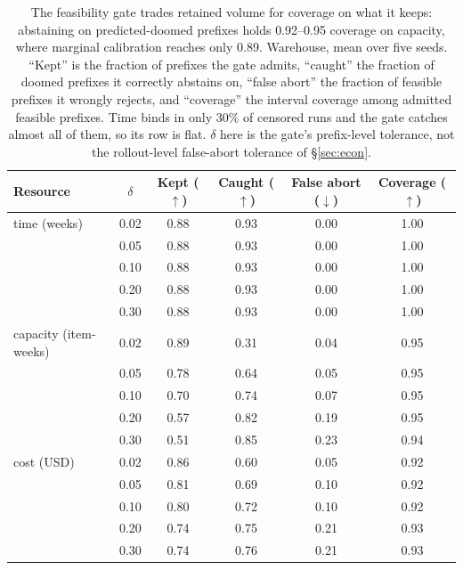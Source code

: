 \documentclass{article}
\begin{document}
\begin{table}[t]
  \caption{The feasibility gate trades retained volume for coverage on what it keeps:
  abstaining on predicted-doomed prefixes holds 0.92--0.95 coverage on capacity,
  where marginal calibration reaches only 0.89. Warehouse, mean over
  five seeds. ``Kept'' is the fraction of prefixes the gate admits, ``caught'' the
  fraction of doomed prefixes it correctly abstains on, ``false abort'' the fraction of
  feasible prefixes it wrongly rejects, and ``coverage'' the interval coverage among
  admitted feasible prefixes. Time binds in only 30\% of censored runs and the gate
  catches almost all of them, so its row is flat. $\delta$ here is the gate's
  prefix-level tolerance, not the rollout-level false-abort tolerance of
  \S\ref{sec:econ}.}
  \label{tab:b3}
  \centering
  \small
  \begin{tabular}{lccccc}
    \toprule
    Resource & $\delta$ & Kept ($\uparrow$) & Caught ($\uparrow$) & False abort ($\downarrow$) & Coverage ($\uparrow$) \\
    \midrule
    time (weeks) & 0.02 & 0.88 & 0.93 & 0.00 & 1.00 \\
     & 0.05 & 0.88 & 0.93 & 0.00 & 1.00 \\
     & 0.10 & 0.88 & 0.93 & 0.00 & 1.00 \\
     & 0.20 & 0.88 & 0.93 & 0.00 & 1.00 \\
     & 0.30 & 0.88 & 0.93 & 0.00 & 1.00 \\
    \midrule
    capacity (item-weeks) & 0.02 & 0.89 & 0.31 & 0.04 & 0.95 \\
     & 0.05 & 0.78 & 0.64 & 0.05 & 0.95 \\
     & 0.10 & 0.70 & 0.74 & 0.07 & 0.95 \\
     & 0.20 & 0.57 & 0.82 & 0.19 & 0.95 \\
     & 0.30 & 0.51 & 0.85 & 0.23 & 0.94 \\
    \midrule
    cost (USD) & 0.02 & 0.86 & 0.60 & 0.05 & 0.92 \\
     & 0.05 & 0.81 & 0.69 & 0.10 & 0.92 \\
     & 0.10 & 0.80 & 0.72 & 0.10 & 0.92 \\
     & 0.20 & 0.74 & 0.75 & 0.21 & 0.93 \\
     & 0.30 & 0.74 & 0.76 & 0.21 & 0.93 \\
    \bottomrule
  \end{tabular}
\end{table}
\end{document}
